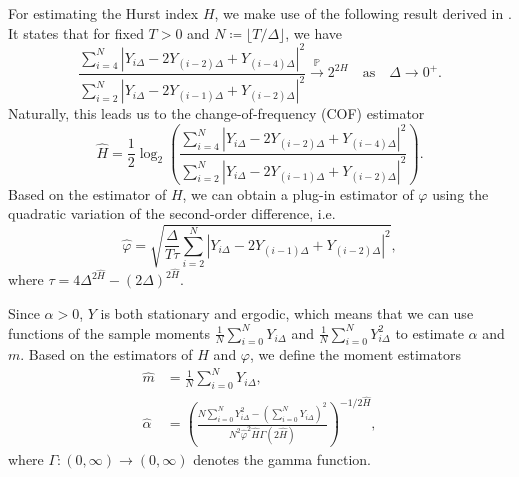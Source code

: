 For estimating the Hurst index $H$, we make use of the following result derived in \cite{barndorff}. It states that for fixed $T>0$ and $N\coloneqq \lfloor T/\Delta\rfloor$, we have
\begin{equation}
    \frac{\sum_{i=4}^{N}|Y_{i\Delta}-2Y_{(i-2)\Delta}+Y_{(i-4)\Delta}|^{2}}{\sum_{i=2}^{N}|Y_{i\Delta}-2Y_{(i-1)\Delta}+ Y_{(i-2)\Delta}|^{2}}\overset{\mathbb{P}}{\to} 2^{2H}\quad \textrm{as}\quad \Delta\to 0^{+}.
\end{equation}
Naturally, this leads us to the change-of-frequency (COF) estimator
\begin{equation}
    \hat{H}=\frac{1}{2}\log_{2}\left(\frac{\sum_{i=4}^{N}|Y_{i\Delta}-2Y_{(i-2)\Delta}+Y_{(i-4)\Delta}|^{2}}{\sum_{i=2}^{N}|Y_{i\Delta}-2Y_{(i-1)\Delta}+ Y_{(i-2)\Delta}|^{2}}\right).
\end{equation}
Based on the estimator of $H$, we can obtain a plug-in estimator of $\varphi$ using the quadratic variation of the second-order difference, i.e.
\begin{equation}
    \hat{\varphi} = \sqrt{\frac{\Delta}{T\tau}\sum_{i=2}^{N}|Y_{i\Delta}-2Y_{(i-1)\Delta}+ Y_{(i-2)\Delta}|^{2}},
\end{equation}
where $\tau = 4\Delta^{2\hat{H}}-(2\Delta)^{2\hat{H}}$. 

Since $\alpha>0$, $Y$ is both stationary and ergodic, which means that we can use functions of the sample moments $\frac{1}{N}\sum_{i=0}^{N}Y_{i\Delta}$ and $\frac{1}{N}\sum_{i=0}^{N}Y_{i\Delta}^{2}$ to estimate $\alpha$ and $m$. Based on the estimators of $H$ and $\varphi$, we define the moment estimators
\begin{align}
    \hat{m} &= \frac{1}{N}\sum_{i=0}^{N}Y_{i\Delta},\\
    \hat{\alpha} &= \left(\frac{N\sum_{i=0}^{N}Y_{i\Delta}^{2}-\left(\sum_{i=0}^{N}Y_{i\Delta}\right)^{2}}{N^{2}\hat{\varphi}^{2}\hat{H}\Gamma(2\hat{H})}\right)^{-1/2\hat{H}},
\end{align}
where $\Gamma: (0,\infty)\to (0,\infty)$ denotes the gamma function.

